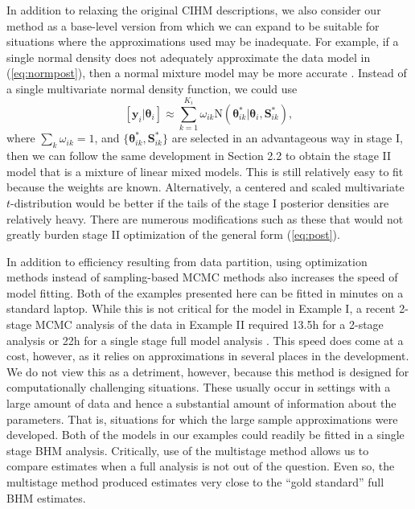 \documentclass[12pt]{article}
\newcommand{\by}{\mathbf{y}}
\newcommand{\bt}{\boldsymbol{\theta}}
\newcommand{\bS}{\mathbf{S}}
\begin{document}
In addition to relaxing the original CIHM descriptions, we also consider our method as a base-level version from which we can expand to be suitable for situations where the approximations used may be inadequate. For example, if a single normal density does not adequately approximate the data model in (\ref{eq:normpost}), then a normal mixture model may be more accurate \citep{gelman2013bayesian}. Instead of a single multivariate normal density function, we could use     
\[
[\by_i|\bt_i] \approx \sum_{k=1}^{K_i}\omega_{ik}\text{N}(\bt_{ik}^*|\bt_{i}, \bS_{ik}^*),
\]
where $\sum_k \omega_{ik} = 1$, and $\{\bt_{ik}^*, \bS_{ik}^*\}$ are selected in an advantageous way in stage I, then we can follow the same development in Section 2.2 to obtain the stage II model that is a mixture of linear mixed models. This is still relatively easy to fit because the weights are known. Alternatively, a centered and scaled multivariate $t$-distribution would be better if the tails of the stage I posterior densities are relatively heavy. There are numerous modifications such as these that would not greatly burden stage II optimization of the general form (\ref{eq:post}).

In addition to efficiency resulting from data partition, using optimization methods instead of sampling-based MCMC methods also increases the speed of model fitting. Both of the examples presented here can be fitted in minutes on a standard laptop. While this is not critical for the model in Example I, a recent 2-stage MCMC analysis of the data in Example II required 13.5h for a 2-stage analysis or 22h for a single stage full model analysis \citep{goudie2019joining}. This speed does come at a cost, however, as it relies on approximations in several places in the development. We do not view this as a detriment, however, because this method is designed for computationally challenging situations. These usually occur in settings with a large amount of data and hence a substantial amount of information about the parameters. That is, situations for which the large sample approximations were developed. Both of the models in our examples could readily be fitted in a single stage BHM analysis. Critically, use of the multistage method allows us to compare estimates when a full analysis is not out of the question. Even so, the multistage method produced estimates very close to the ``gold standard'' full BHM estimates.
\end{document}
